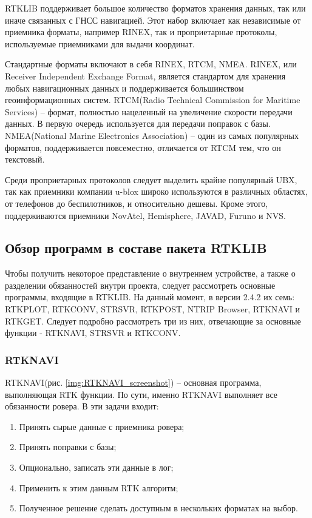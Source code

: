 RTKLIB поддерживает большое количество форматов хранения данных, так или иначе связанных с ГНСС навигацией. Этот набор включает как независимые от приемника форматы, например RINEX, так и проприетарные протоколы, используемые приемниками для выдачи координат.

Стандартные форматы включают в себя RINEX, RTCM, NMEA. RINEX, или Receiver Independent Exchange Format, является стандартом для хранения любых навигационных данных и поддерживается большинством геоинформационных систем. RTCM(Radio Technical Commission for Maritime Services) – формат, полностью нацеленный на увеличение скорости передачи данных. В первую очередь используется для передачи поправок с базы. NMEA(National Marine Electronics Association) – один из самых популярных форматов, поддерживается повсеместно, отличается от RTCM тем, что он текстовый.

Среди проприетарных протоколов следует выделить крайне популярный UBX, так как приемники компании u-blox широко используются в различных областях, от телефонов до беспилотников, и относительно дешевы. Кроме этого, поддерживаются приемники NovAtel, Hemisphere, JAVAD, Furuno и NVS.

\subsection{Обзор программ в составе пакета RTKLIB} \label{subsect_1_2_4}

Чтобы получить некоторое представление о внутреннем устройстве, а также о разделении обязанностей внутри проекта, следует рассмотреть основные программы, входящие в RTKLIB. На данный момент, в версии 2.4.2 их семь: RTKPLOT, RTKCONV, STRSVR, RTKPOST, NTRIP Browser, RTKNAVI и RTKGET. Следует подробно рассмотреть три из них, отвечающие за основные функции - RTKNAVI, STRSVR и RTKCONV.

\subsubsection{RTKNAVI} \label{subsubsect_1_2_4_1}

RTKNAVI(рис. \ref{img:RTKNAVI_screenshot}) – основная программа, выполняющая RTK функции. По сути, именно RTKNAVI выполняет все обязанности ровера. В эти задачи входит:

\begin{enumerate}
  \item Принять сырые данные с приемника ровера;
  \item Принять поправки с базы;
  \item Опционально, записать эти данные в лог;
  \item Применить к этим данным RTK алгоритм;
  \item Полученное решение сделать доступным в нескольких форматах на выбор.
\end{enumerate}

